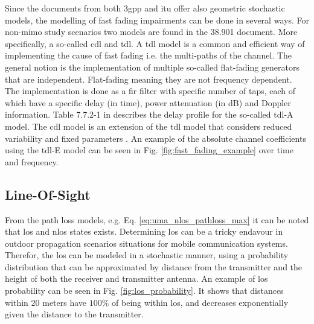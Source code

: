 Since the documents from both \gls{3gpp} and \gls{itu} offer also geometric stochastic models, the modelling of fast fading impairments can be done in several ways. For non-\gls{mimo} study scenarios two models are found in the 38.901 document. More specifically, a so-called \gls{cdl} and \gls{tdl}. A \gls{tdl} model is a common and efficient way of implementing the cause of fast fading i.e. the multi-paths of the channel. The general notion is the implementation of multiple so-called flat-fading generators that are independent. Flat-fading meaning they are not frequency dependent. The implementation is done as a \gls{fir} filter with specific number of taps, each of which have a specific delay (in time),  power attenuation (in dB) and Doppler information. Table 7.7.2-1 in \cite{3GPP38901} describes the delay profile for the so-called \gls{tdl}-A model. The \gls{cdl} model is an extension of the \gls{tdl} model that considers reduced variability and fixed parameters \cite{ITU2412}. An example of the absolute channel coefficients using the \gls{tdl}-E model can be seen in Fig. \ref{fig:fast_fading_example} over time and frequency. 



\subsection{Line-Of-Sight}
From the path loss models, e.g. Eq. \ref{eq:uma_nlos_pathloss_max} it can be noted that \gls{los} and \gls{nlos} states exists. Determining \gls{los} can be a tricky endavour in outdoor propagation scenarios situations for mobile communication systems. Therefor, the \gls{los} can be modeled in a stochastic manner, using a probability distribution that can be approximated by distance from the transmitter and the height of both the receiver and transmitter antenna. An example of \gls{los} probability can be seen in Fig. \ref{fig:los_probability}. It shows that distances within $20$ meters have $100\%$ of being within \gls{los}, and decreases exponentially given the distance to the transmitter. 

